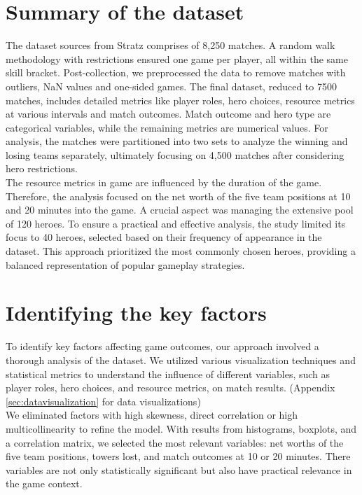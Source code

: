 \documentclass[11pt]{article}
\begin{document}
\section{Summary of the dataset}
The dataset sources from Stratz\cite{stratzWebsite} comprises of 8,250 matches.
A random walk methodology with restrictions ensured one game per player, all
within the same skill bracket. Post-collection, we preprocessed the data to
remove matches with outliers, NaN values and one-sided games.
The final dataset, reduced to 7500 matches, includes detailed metrics like
player roles, hero choices, resource metrics at various intervals and match
outcomes. Match outcome and hero type are categorical variables, while the
remaining metrics are numerical values. For analysis, the matches were
partitioned into two sets to analyze the winning and losing teams separately,
ultimately focusing on 4,500 matches after considering hero restrictions.
\\

The resource metrics in game are influenced by the duration of the game. Therefore,
the analysis focused on the net worth of the five team positions at 10 and 20
minutes into the game. A crucial aspect was managing the extensive pool of 120
heroes. To ensure a practical and effective analysis, the study limited its focus
to 40 heroes, selected based on their frequency of appearance in the dataset.
This approach prioritized the most commonly chosen heroes, providing a balanced
representation of popular gameplay strategies.

\section{Identifying the key factors}
To identify key factors affecting game outcomes, our approach involved a thorough
analysis of the dataset. We utilized various visualization techniques and statistical
metrics to understand the influence of different variables, such as player roles,
hero choices, and resource metrics, on match results.
(Appendix \ref{sec:datavisualization} for data visualizations)
\\

We eliminated factors with high skewness, direct correlation or high multicollinearity to refine the model.
With results from histograms, boxplots, and a correlation matrix, we selected
the most relevant variables: net worths of the five team positions, towers lost,
and match outcomes at 10 or 20 minutes. There variables are not only statistically
significant but also have practical relevance in the game context.
\\
\end{document}
